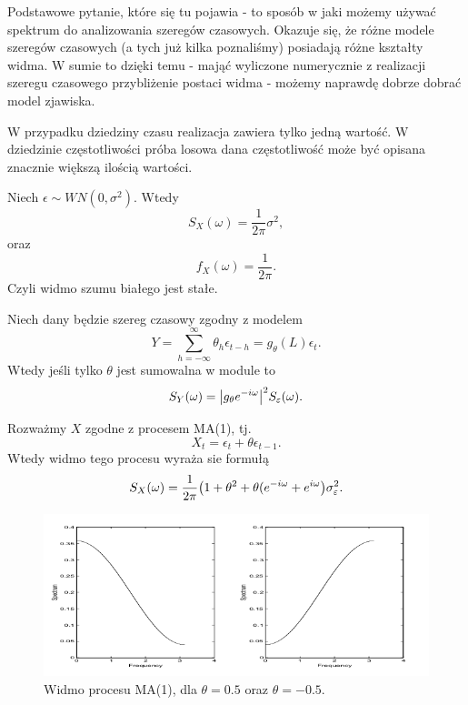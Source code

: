 \documentclass[10pt,a4paper]{book}
\begin{document}
Podstawowe pytanie, które się tu pojawia - to sposób w jaki możemy używać spektrum do analizowania szeregów czasowych. Okazuje się, że różne modele szeregów czasowych (a tych już kilka poznaliśmy) posiadają różne kształty widma. W sumie to dzięki temu - mająć wyliczone numerycznie z realizacji szeregu czasowego przybliżenie postaci widma - możemy naprawdę dobrze dobrać model zjawiska.

\begin{remark*}
W przypadku dziedziny czasu realizacja zawiera tylko jedną wartość. W dziedzinie częstotliwości próba losowa dana częstotliwość może być opisana znacznie większą ilością wartości.
\end{remark*} 

\begin{theorem}
Niech $\epsilon \sim WN(0,\sigma^2)$. Wtedy 
$$
S_X (\omega) = \frac{1}{2\pi} \sigma^2,
$$
oraz 
$$
f_X (\omega) = \frac{1}{2\pi}.
$$
Czyli widmo szumu białego jest stałe.
\end{theorem}

\begin{theorem}
Niech dany będzie szereg czasowy zgodny z modelem 
$$
Y = \sum_{h=-\infty}^{\infty} \theta_h \epsilon_{t-h} = g_{\theta} (L) \epsilon_t.
$$
Wtedy jeśli tylko $\theta$ jest sumowalna w module to 
$$
S_{Y} (\omega) = {\left| {g_{\theta} e^{-i \omega}} \right|}^2 S_\varepsilon(\omega).
$$
\end{theorem}

\begin{theorem}
Rozważmy $X$ zgodne z procesem MA(1), tj.
$$
X_t = \epsilon_t + \theta \epsilon_{t-1}.
$$
Wtedy widmo tego procesu wyraża sie formułą
$$
S_X(\omega) = \frac{1}{2\pi} {\left( {1 + \theta^2 + \theta (e^{-i \omega} + e^{i \omega}} \right)} \sigma_\varepsilon^2.
$$
\end{theorem}

\begin{figure}
\centering
\includegraphics[scale=0.6]{images/spectrumMA1.png}
\caption{Widmo procesu MA(1), dla $\theta = 0.5$ oraz $\theta= -0.5$.} \label{fig-spectrum-ma1}
\end{figure}
\end{document}
